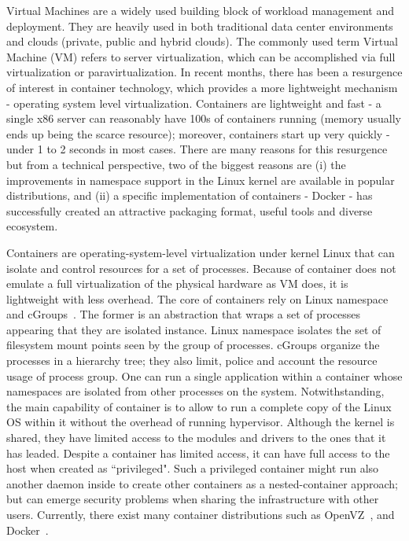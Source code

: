 \documentclass[conference]{IEEEtran}
\begin{document}
Virtual Machines are a widely used building block 
of workload management and deployment. They are heavily used
in both traditional data center environments and clouds (private, public and hybrid clouds). The commonly used term Virtual Machine (VM) refers to server virtualization, which can be accomplished via full virtualization or paravirtualization. In recent months, there has been a resurgence of interest in container technology, which provides a more lightweight mechanism - operating system level virtualization. Containers are lightweight and fast - a single x86 server can reasonably have 100s of containers running (memory usually ends up being the scarce resource); moreover, containers start up very quickly - under 1 to 2 seconds in most cases. There are many reasons for this resurgence but from a technical perspective, two of the biggest reasons are (i) the improvements in namespace support in the Linux kernel are available in popular distributions, and (ii) a specific implementation of containers - Docker - has successfully created an attractive packaging format, useful tools and diverse ecosystem.

Containers are operating-system-level virtualization under kernel Linux that
can isolate and control resources for a set of processes. 
Because of container does not emulate a full virtualization of the physical hardware as VM does, it
is lightweight with less overhead. 
The core of containers rely on Linux
namespace~\cite{namespace} and cGroups~\cite{cgroups}. The former is an
abstraction that wraps a set of processes appearing that they are isolated
instance. 
Linux namespace isolates the set of filesystem mount points seen by
the group of processes. cGroups organize the processes in a hierarchy tree; they
also limit, police and account the resource usage of process group. One can
run a single application within a container whose namespaces are isolated
from other processes on the system. 
Notwithstanding, the main capability of
container is to allow to run a complete copy of the Linux OS within it without
the overhead of running hypervisor. Although the kernel is shared, they have
limited access to the modules and drivers to the ones that it has leaded.
Despite a container has limited access, it can have full access to the host
when created as ``privileged". Such a privileged container might run also
another daemon inside to create other containers as a nested-container
approach; but can emerge security problems when sharing the infrastructure
with other users. Currently, there exist many container distributions such as
OpenVZ~\cite{OpenVZ}, and Docker~\cite{Docker}.
\end{document}
